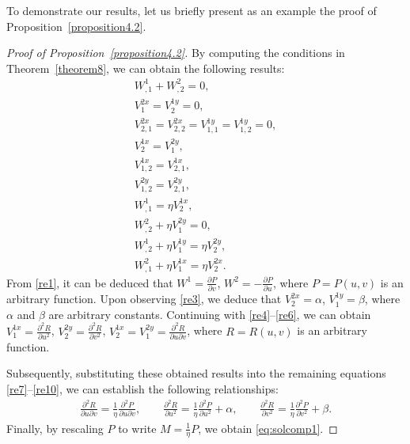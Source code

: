 \documentclass[pdftex]{sigma}
\numberwithin{equation}{section}
\begin{document}
To demonstrate our results, let us briefly present as an example the proof of Proposition~\ref{proposition4.2}.
\begin{proof}[Proof of Proposition~\ref{proposition4.2}]\allowdisplaybreaks
By computing the conditions in Theorem~\ref{theorem8}, we can obtain the following results:
\begin{subequations}
\begin{gather}
 W^1_{,1}+W^2_{,2}=0,\label{re1}\\
 V^{2x}_1=V^{1y}_2=0,\label{re2}\\
 V^{2x}_{2,1}=V^{2x}_{2,2}=V^{1y}_{1,1}=V^{1y}_{1,2}=0,\label{re3}\\
 V^{1x}_2=V^{2y}_1,\label{re4}\\
 V^{1x}_{1,2}=V^{1x}_{2,1},\label{re5}\\
 V^{2y}_{1,2}=V^{2y}_{2,1},\label{re6}\\
 W^1_{,1}=\eta V^{1x}_2,\label{re7}\\
 W^2_{,2}+\eta V^{2y}_1=0,\label{re8}\\
 W^1_{,2}+\eta V^{1y}_1=\eta V^{2y}_2,\label{re9}\\
 W^2_{,1}+\eta V^{1x}_1=\eta V^{2x}_2.\label{re10}
\end{gather}
\end{subequations}
From \eqref{re1}, it can be deduced that
$W^1=\frac{\partial P}{\partial v}$,
$W^2=-\frac{\partial P}{\partial u}$,
where $P=P(u,v)$ is an arbitrary function.
Upon observing \eqref{re3}, we deduce that
$V^{2x}_2=\alpha$,
$V^{1y}_1=\beta$,
where $\alpha$ and $\beta$ are arbitrary constants.
Continuing with \eqref{re4}--\eqref{re6}, we can obtain
$V^{1x}_1=\frac{\partial^2 R}{\partial u^2}$,
$V^{2y}_2=\frac{\partial^2 R}{\partial v^2}$,
$V^{1x}_2=V^{2y}_1=\frac{\partial^2 R}{\partial u\partial v}$,
where $R=R(u,v)$ is an arbitrary function.

Subsequently, substituting these obtained results into the remaining equations \eqref{re7}--\eqref{re10}, we can establish the following relationships:
\begin{gather*}
\frac{\partial^2 R}{\partial u\partial v}=\frac{1}{\eta}\frac{\partial^2P}{\partial u\partial v},\qquad
\frac{\partial^2 R}{\partial u^2}=\frac{1}{\eta}\frac{\partial^2P}{\partial u^2}+\alpha,\qquad
\frac{\partial^2 R}{\partial v^2}=\frac{1}{\eta}\frac{\partial^2P}{\partial v^2}+\beta.
\end{gather*}
Finally, by rescaling $P$ to write $M=\frac{1}{\eta}P$, we obtain \eqref{eq:solcomp1}.
\end{proof}
\end{document}
